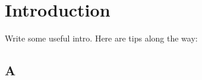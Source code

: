 \chapter{Introduction}
\label{sec:intro}
Write some useful intro. Here are tips along the way:

\section{A}